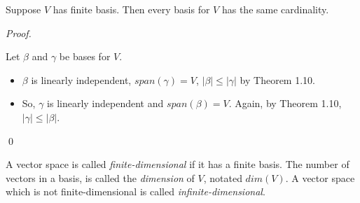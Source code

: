 \documentclass[12pt]{article}
\newenvironment{corollary}[2][Corollary]{\begin{trivlist}
\item[\hskip \labelsep {\bfseries #1}\hskip \labelsep {\bfseries #2}]}{\end{trivlist}}
\newenvironment{definition}[2][Definition]{\begin{trivlist}
\item[\hskip \labelsep {\bfseries #1}\hskip \labelsep {\bfseries #2}]}{\end{trivlist}}
\newenvironment{sol}
    {\emph{Proof.}
    }
    {
    \qed
    }
\begin{document}
\begin{corollary}{13}
Suppose $V$ has finite basis. Then every basis for $V$ has the same cardinality.
\end{corollary}

\begin{sol}
Let $\beta$ and $\gamma$ be bases for $V$.

\begin{itemize}
    \item $\beta$ is linearly independent, $span(\gamma) = V$, $| \beta | \leq | \gamma |$ by Theorem 1.10.
    
    \item So, $\gamma$ is linearly independent and $span(\beta) = V$. Again, by Theorem 1.10, $| \gamma | \leq | \beta |$.
\end{itemize}
\end{sol}

\begin{definition}{9}
A vector space is called \textit{finite-dimensional} if it has a finite basis. The number of vectors in a basis, is called the \textit{dimension} of $V$, notated $dim(V)$. A vector space which is not finite-dimensional is called \textit{infinite-dimensional}.
\end{definition}
\end{document}
